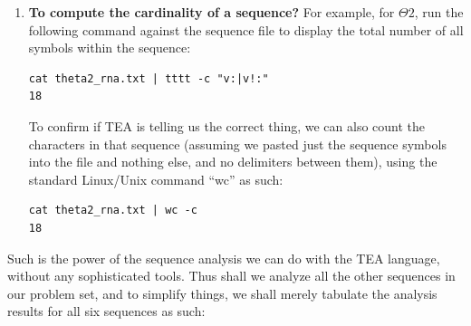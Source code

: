 \documentclass[a4paper, 18pt]{book} %
\begin{document}
\begin{enumerate}
{\vspace{1em}

  
  \vspace{1em}

The essential result from running that program against $$ is the string \textbf{C4T3G3A2}, which tells us that `C' occurs 4 times, `T' 3 times, ... , and then `A' only 2 times --- the symbols in the sequence, and their frequencies, sorted in descending order of most frequent (mode) first, otherwise by their natural order of first occurrence (when two symbols have same frequency). 
}
\item {\textbf{To compute the cardinality of a sequence?} For example, for $\Theta2$, run the following command against the sequence file to display the total number of all symbols within the sequence:

\vspace{1em}

\begin{verbatim}
cat theta2_rna.txt | tttt -c "v:|v!:"
18
\end{verbatim}

\vspace{1em}

To confirm if TEA is telling us the correct thing, we can also count the characters in that sequence (assuming we pasted just the sequence symbols into the file and nothing else, and no delimiters between them), using the standard Linux/Unix command ``wc'' as such:

\vspace{1em}

\begin{verbatim}
cat theta2_rna.txt | wc -c
18
\end{verbatim}

}
\end{enumerate}


Such is the power of the sequence analysis we can do with the TEA language, without any sophisticated tools. Thus shall we analyze all the other sequences in our problem set, and to simplify things, we shall merely tabulate the analysis results for all six sequences as such:
\end{document}
